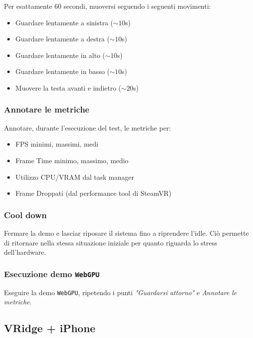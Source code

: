 \documentclass[a4paper, 11pt, twoside]{report}
\begin{document}
Per esattamente $60$ secondi, muoversi seguendo i seguenti movimenti:

\begin{itemize}
    \item Guardare lentamente a sinistra ($\sim10$s)
    \item Guardare lentamente a destra ($\sim10$s)
    \item Guardare lentamente in alto ($\sim10$s)
    \item Guardare lentamente in basso ($\sim10$s)
    \item Muovere la testa avanti e indietro ($\sim20$s)
\end{itemize}

\subsubsection{Annotare le metriche}\label{a4:notemetrics}

Annotare, durante l'esecuzione del test, le metriche per:

\begin{itemize}
    \item FPS minimi, massimi, medi
    \item Frame Time minimo, massimo, medio
    \item Utilizzo CPU/VRAM dal task manager
    \item Frame Droppati (dal performance tool di SteamVR)
\end{itemize}

\subsubsection{Cool down}

Fermare la demo e lasciar riposare il sistema fino a riprendere l'idle. Ciò permette di ritornare nella stessa
situazione iniziale per quanto riguarda lo stress dell'hardware.

\subsubsection{Esecuzione demo \texttt{WebGPU}}

Eseguire la demo \texttt{WebGPU}, ripetendo i punti \textit{"Guardarsi attorno"} e \textit{Annotare le metriche}.

\subsection{VRidge + iPhone}
\end{document}
